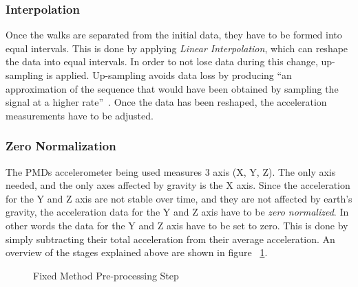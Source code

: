 \documentclass{sig-alternate}
\begin{document}
\subsubsection{Interpolation} 
	Once the walks are separated from the initial data, they have to be formed into equal intervals. This is done by applying \textit{Linear Interpolation}, which can reshape the data  into equal intervals. In order to not lose data during this change, up-sampling is applied. Up-sampling avoids data loss by producing ``an approximation of the sequence that would have been obtained by sampling the signal at a higher rate''~\cite{wiki1:2014}. Once the data has been reshaped, the acceleration measurements have to be adjusted. 
\subsubsection{Zero Normalization}
	The PMDs accelerometer being used measures 3 axis (X, Y, Z). The only axis needed, and the only axes affected by gravity is the X axis. Since the acceleration for the Y and Z axis are not stable over time, and they are not affected by earth's gravity, the acceleration data for the Y and Z axis have to be \textit{zero normalized}. In other words the data for the Y and Z axis have to be set to zero. This is done by simply subtracting their total acceleration from their average acceleration. An overview of the stages explained above are shown in figure ~\ref{fig:firstStep}.
	
\begin{figure}
\centering
{}
\caption{Fixed Method Pre-processing Step}
\label{fig:firstStep}
\end{figure}
\end{document}
